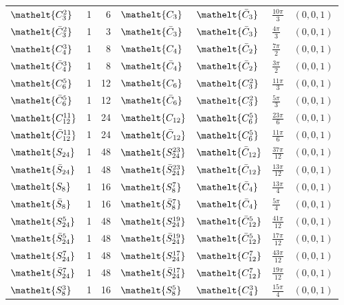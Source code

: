 \documentclass[10pt,a4paper]{article}
\numberwithin{equation}{section}
\newcommand{\eltfont}[1]{{\let\sigma\eltsigma\mathelt{#1}}}
\newcommand{\cls}[1]{\eltfont{#1}}
\newcommand{\dirvec}[3]{(#1, #2, #3)}
\newcommand{\barred}[1]{\bar{#1}}
\begin{document}
{\begin{longtable}{@{}lrrllll@{}}
$\cls{C_{3}^{2}}$ & 1 & 6 & $\cls{C_{3}}$ & $\cls{\barred{C}_{3}}$ & $\tfrac{10\pi}{3}$ & $\dirvec{0}{0}{1}$\\
$\cls{\barred{C}_{3}^{2}}$ & 1 & 3 & $\cls{\barred{C}_{3}}$ & $\cls{\barred{C}_{3}}$ & $\tfrac{4\pi}{3}$ & $\dirvec{0}{0}{1}$\\
$\cls{C_{4}^{3}}$ & 1 & 8 & $\cls{C_{4}}$ & $\cls{\barred{C}_{2}}$ & $\tfrac{7\pi}{2}$ & $\dirvec{0}{0}{1}$\\
$\cls{\barred{C}_{4}^{3}}$ & 1 & 8 & $\cls{\barred{C}_{4}}$ & $\cls{\barred{C}_{2}}$ & $\tfrac{3\pi}{2}$ & $\dirvec{0}{0}{1}$\\
$\cls{C_{6}^{5}}$ & 1 & 12 & $\cls{C_{6}}$ & $\cls{C_{3}^{2}}$ & $\tfrac{11\pi}{3}$ & $\dirvec{0}{0}{1}$\\
$\cls{\barred{C}_{6}^{5}}$ & 1 & 12 & $\cls{\barred{C}_{6}}$ & $\cls{C_{3}^{2}}$ & $\tfrac{5\pi}{3}$ & $\dirvec{0}{0}{1}$\\
$\cls{C_{12}^{11}}$ & 1 & 24 & $\cls{C_{12}}$ & $\cls{C_{6}^{5}}$ & $\tfrac{23\pi}{6}$ & $\dirvec{0}{0}{1}$\\
$\cls{\barred{C}_{12}^{11}}$ & 1 & 24 & $\cls{\barred{C}_{12}}$ & $\cls{C_{6}^{5}}$ & $\tfrac{11\pi}{6}$ & $\dirvec{0}{0}{1}$\\
$\cls{S_{24}}$ & 1 & 48 & $\cls{S_{24}^{23}}$ & $\cls{\barred{C}_{12}}$ & $\tfrac{37\pi}{12}$ & $\dirvec{0}{0}{1}$\\
$\cls{\barred{S}_{24}}$ & 1 & 48 & $\cls{\barred{S}_{24}^{23}}$ & $\cls{\barred{C}_{12}}$ & $\tfrac{13\pi}{12}$ & $\dirvec{0}{0}{1}$\\
$\cls{S_{8}}$ & 1 & 16 & $\cls{S_{8}^{7}}$ & $\cls{\barred{C}_{4}}$ & $\tfrac{13\pi}{4}$ & $\dirvec{0}{0}{1}$\\
$\cls{\barred{S}_{8}}$ & 1 & 16 & $\cls{\barred{S}_{8}^{7}}$ & $\cls{\barred{C}_{4}}$ & $\tfrac{5\pi}{4}$ & $\dirvec{0}{0}{1}$\\
$\cls{S_{24}^{5}}$ & 1 & 48 & $\cls{S_{24}^{19}}$ & $\cls{\barred{C}_{12}^{5}}$ & $\tfrac{41\pi}{12}$ & $\dirvec{0}{0}{1}$\\
$\cls{\barred{S}_{24}^{5}}$ & 1 & 48 & $\cls{\barred{S}_{24}^{19}}$ & $\cls{\barred{C}_{12}^{5}}$ & $\tfrac{17\pi}{12}$ & $\dirvec{0}{0}{1}$\\
$\cls{S_{24}^{7}}$ & 1 & 48 & $\cls{S_{24}^{17}}$ & $\cls{C_{12}^{7}}$ & $\tfrac{43\pi}{12}$ & $\dirvec{0}{0}{1}$\\
$\cls{\barred{S}_{24}^{7}}$ & 1 & 48 & $\cls{\barred{S}_{24}^{17}}$ & $\cls{C_{12}^{7}}$ & $\tfrac{19\pi}{12}$ & $\dirvec{0}{0}{1}$\\
$\cls{S_{8}^{3}}$ & 1 & 16 & $\cls{S_{8}^{5}}$ & $\cls{C_{4}^{3}}$ & $\tfrac{15\pi}{4}$ & $\dirvec{0}{0}{1}$\\

\end{longtable}}
\end{document}
